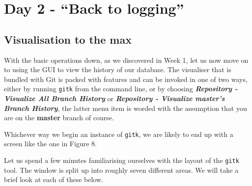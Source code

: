 
\section{Day 2 - ``Back to logging''}
\subsection{Visualisation to the max}

With the basic operations down, as we discovered in Week 1, let us now move on to using the GUI to view the history of our database.
The visualiser that is bundled with Git is packed with features and can be invoked in one of two ways, either by running \texttt{gitk} from the command line, or by choosing \textbf{\emph{Repository - Visualize All Branch History}} or \textbf{\emph{Repository - Visualize master's Branch History}}, the latter menu item is worded with the assumption that you are on the \textbf{master} branch of course.

Whichever way we begin an instance of \texttt{gitk}, we are likely to end up with a screen like the one in Figure 8.


Let us spend a few minutes familiarising ourselves with the layout of the \texttt{gitk} tool.
The window is split up into roughly seven different areas.
We will take a brief look at each of these below.

